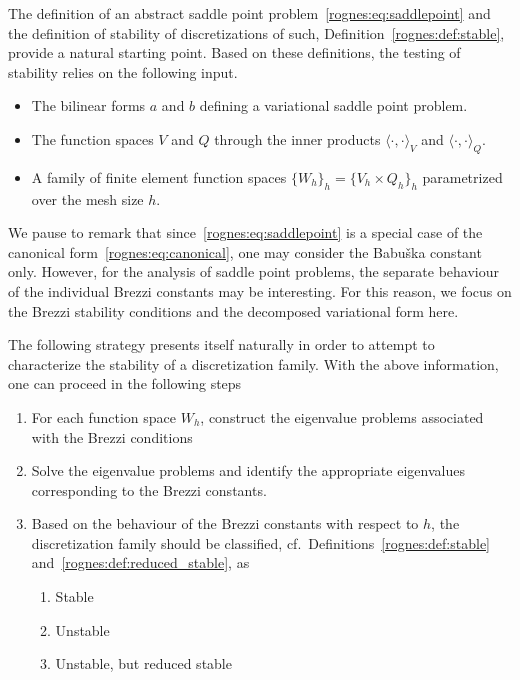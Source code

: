 The definition of an abstract saddle point
problem~\eqref{rognes:eq:saddlepoint} and the definition of stability
of discretizations of such, Definition~\ref{rognes:def:stable},
provide a natural starting point. Based on these definitions, the
testing of stability relies on the following input.
\begin{itemize}
\item The bilinear forms $a$ and $b$ defining a variational
  saddle point problem.
\item The function spaces $V$ and $Q$ through the inner products
  $\langle \cdot, \cdot \rangle_{V}$ and $\langle \cdot, \cdot
  \rangle_{Q}$.
\item A family of finite element function spaces $\{W_h\}_h = \{V_h
  \times Q_h \}_h$ parametrized over the mesh size $h$.
\end{itemize}
We pause to remark that since~\eqref{rognes:eq:saddlepoint} is a special case
of the canonical form~\eqref{rognes:eq:canonical}, one may consider the
Babu\v ska constant only. However, for the analysis of saddle point
problems, the separate behaviour of the individual Brezzi constants
may be interesting. For this reason, we focus on the Brezzi stability
conditions and the decomposed variational form here.

The following strategy presents itself naturally in order to attempt
to characterize the stability of a discretization family. With the
above information, one can proceed in the following steps
\begin{enumerate}
\item For each function space $W_h$, construct the eigenvalue problems
  associated with the Brezzi conditions
\item Solve the eigenvalue problems and identify the appropriate
  eigenvalues corresponding to the Brezzi constants.
\item Based on the behaviour of the Brezzi constants with respect to
  $h$, the discretization family should be classified,
  cf.~Definitions~\ref{rognes:def:stable} and~\ref{rognes:def:reduced_stable}, as
  \begin{enumerate}
  \item Stable
  \item Unstable
  \item Unstable, but reduced stable
  \end{enumerate}
\end{enumerate}

